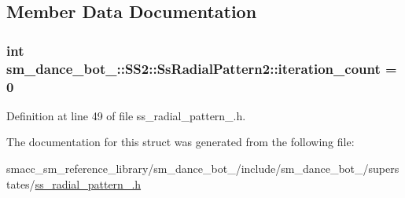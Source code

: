 \subsection{Member Data Documentation}
\subsubsection[{\texorpdfstring{iteration\+\_\+count}{iteration_count}}]{\setlength{\rightskip}{0pt plus 5cm}int sm\+\_\+dance\+\_\+bot\+\_\+::\+S\+S2\+::\+Ss\+Radial\+Pattern2\+::iteration\+\_\+count = 0}\hypertarget{structsm__dance__bot__3_1_1SS2_1_1SsRadialPattern2_ae214d5caeae81f505b2b41e4d6427cd3}{}\label{structsm__dance__bot__3_1_1SS2_1_1SsRadialPattern2_ae214d5caeae81f505b2b41e4d6427cd3}


Definition at line 49 of file ss\+\_\+radial\+\_\+pattern\+\_.\+h.



The documentation for this struct was generated from the following file\+:\begin{DoxyCompactItemize}
\item 
smacc\+\_\+sm\+\_\+reference\+\_\+library/sm\+\_\+dance\+\_\+bot\+\_/include/sm\+\_\+dance\+\_\+bot\+\_/superstates/\hyperlink{3_2include_2sm__dance__bot__3_2superstates_2ss__radial__pattern__2_8h}{ss\+\_\+radial\+\_\+pattern\+\_.\+h}\end{DoxyCompactItemize}
